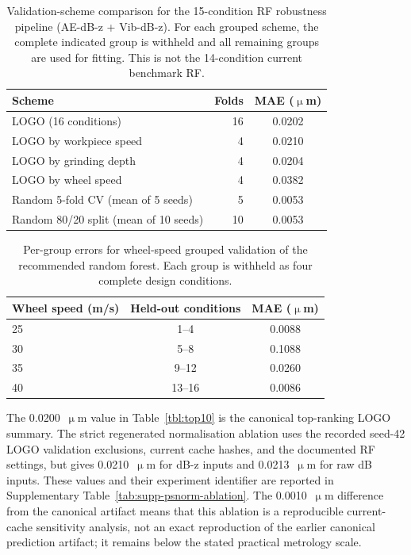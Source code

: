 \begin{table}[htbp]
\centering
\caption{Validation-scheme comparison for the 15-condition RF robustness
pipeline (AE-dB-z + Vib-dB-z). For each grouped scheme, the complete indicated
group is withheld and all remaining groups are used for fitting. This is not
the 14-condition current benchmark RF.}\label{tab:cv-schemes}
\begin{tabular}{@{}lrc@{}}
\toprule
Scheme & Folds & MAE (\(\upmu\)m) \\
\midrule
LOGO (16 conditions) & 16 & 0.0202 \\
LOGO by workpiece speed & 4 & 0.0210 \\
LOGO by grinding depth & 4 & 0.0204 \\
LOGO by wheel speed & 4 & 0.0382 \\
Random 5-fold CV (mean of 5 seeds) & 5 & 0.0053 \\
Random 80/20 split (mean of 10 seeds) & 10 & 0.0053 \\
\bottomrule
\end{tabular}
\end{table}

\begin{table}[htbp]
\centering
\caption{Per-group errors for wheel-speed grouped validation of the
recommended random forest. Each group is withheld as four complete design
conditions.}\label{tab:wheel-speed-groups}
\begin{tabular}{@{}lcc@{}}
\toprule
Wheel speed (m/s) & Held-out conditions & MAE (\(\upmu\)m) \\
\midrule
25 & 1--4 & 0.0088 \\
30 & 5--8 & 0.1088 \\
35 & 9--12 & 0.0260 \\
40 & 13--16 & 0.0086 \\
\bottomrule
\end{tabular}
\end{table}

The 0.0200~\(\upmu\)m value in Table~\ref{tbl:top10} is the canonical
top-ranking LOGO summary. The strict regenerated normalisation ablation
uses the recorded seed-42 LOGO validation exclusions, current cache hashes,
and the documented RF settings, but gives 0.0210~\(\upmu\)m for dB-z
inputs and 0.0213~\(\upmu\)m for raw dB inputs. These values and their
experiment identifier are reported in Supplementary
Table~\ref{tab:supp-psnorm-ablation}. The 0.0010~\(\upmu\)m difference
from the canonical artifact means that this ablation is a reproducible
current-cache sensitivity analysis, not an exact reproduction of the
earlier canonical prediction artifact; it remains below the stated
practical metrology scale.

